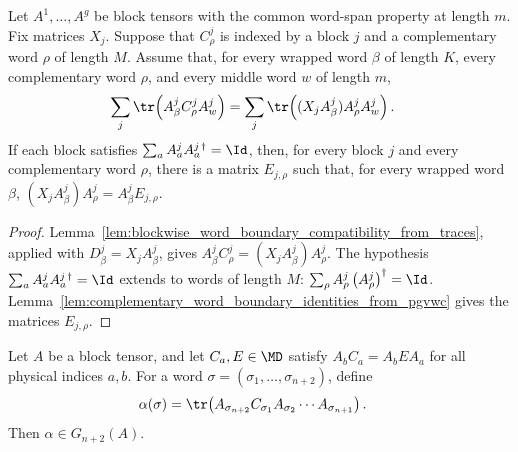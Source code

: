 \begin{lemma}
    \label{lem:complementary_word_boundary_identities_from_trace_decompositions}
    \leanok
    Let $A^1,\ldots,A^g$ be block tensors with the common word-span property
    at length $m$. Fix matrices $X_j$. Suppose that $C^j_\rho$ is indexed
    by a block $j$ and a complementary word $\rho$ of length $M$. Assume
    that, for every wrapped word $\beta$ of length $K$, every complementary
    word $\rho$, and every middle word $w$ of length $m$,
    \begin{align}
        \sum_j\tr\!\left(A^j_\beta C^j_\rho A^j_w\right)
         & =
        \sum_j\tr\!\left((X_jA^j_\beta)A^j_\rho A^j_w\right).
        \notag
    \end{align}
    If each block satisfies
    $\sum_a A^j_aA^{j\,\dagger}_a = \Id$,
    then, for every block $j$ and every complementary word $\rho$, there is
    a matrix $E_{j,\rho}$ such that, for every wrapped word $\beta$,
    $(X_jA^j_\beta)A^j_\rho = A^j_\beta E_{j,\rho}$.
\end{lemma}

\begin{proof}
    \leanok
    Lemma~\ref{lem:blockwise_word_boundary_compatibility_from_traces}, applied
    with $D^j_\beta=X_jA^j_\beta$, gives
    $A^j_\beta C^j_\rho = (X_jA^j_\beta)A^j_\rho$.
    The hypothesis $\sum_a A^j_a A^{j\,\dagger}_a=\Id$ extends to words of
    length $M$:
    $\sum_\rho A^j_\rho\left(A^j_\rho\right)^\dagger = \Id$.
    Lemma~\ref{lem:complementary_word_boundary_identities_from_pgvwc} gives
    the matrices $E_{j,\rho}$.
\end{proof}

\begin{lemma}
    \label{lem:left_boundary_component_mem_ground_space}
    \leanok
    Let $A$ be a block tensor, and let $C_a,E\in\MD$ satisfy
    $A_b C_a = A_bEA_a$
    for all physical indices $a,b$. For a word
    $\sigma=(\sigma_1,\ldots,\sigma_{n+2})$, define
    \begin{align}
        \alpha(\sigma)
         & =
        \tr\!\left(A_{\sigma_{n+2}} C_{\sigma_1}
        A_{\sigma_2}\cdots A_{\sigma_{n+1}}\right).
        \notag
    \end{align}
    Then $\alpha\in G_{n+2}(A)$.
\end{lemma}

